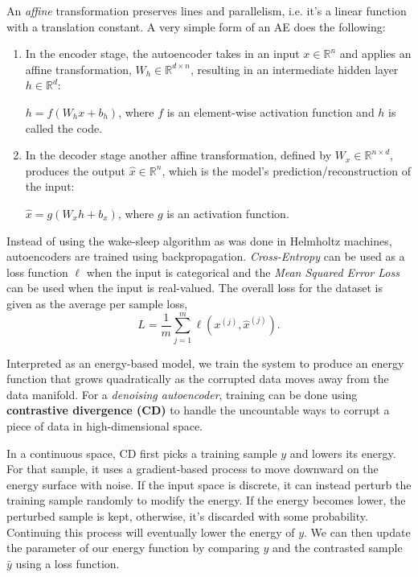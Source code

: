 \documentclass{article}
\begin{document}
An \textit{affine} transformation preserves lines and parallelism, i.e. it's a linear function with a translation constant. A very simple form of an AE does the following:

\begin{enumerate}
    \item In the encoder stage, the autoencoder takes in an input $x \in \mathbb R^n$ and applies an affine transformation, $W_h \in \mathbb R^{d\times n}$, resulting in an intermediate hidden layer $h \in \mathbb R^d$:
    
    $h = f(W_h x + b_h)$, where $f$ is an element-wise activation function and $h$ is called the code.
    
    \item In the decoder stage another affine transformation, defined by $W_x  \in \mathbb R^{n\times d}$, produces the output $\hat{x} \in \mathbb R^n$, which is the model's prediction/reconstruction of the input:
    
    $\hat{x} = g(W_x h + b_x)$, where $g$ is an activation function.
\end{enumerate}

Instead of using the wake-sleep algorithm as was done in Helmholtz machines, autoencoders are trained using backpropagation. \textit{Cross-Entropy} can be used as a loss function $\ell$ when the input is categorical and the \textit{Mean Squared Error Loss} can be used when the input is real-valued. The overall loss for the dataset is given as the average per sample loss,
\[
    L = \frac{1}{m}\sum_{j=1}^m \ell (x^{(j)}, \hat x^{(j)}).
\]


Interpreted as an energy-based model, we train the system to produce an energy function that grows quadratically as the corrupted data moves away from the data manifold. For a \textit{denoising autoencoder}, training can be done using \textbf{contrastive divergence (CD)} to handle the uncountable ways to corrupt a piece of data in high-dimensional space. 

In a continuous space, CD first picks a training sample $y$ and lowers its energy. For that sample, it uses a gradient-based process to move downward on the energy surface with noise. If the input space is discrete, it can instead perturb the training sample randomly to modify the energy. If the energy becomes lower, the perturbed sample is kept, otherwise, it's discarded with some probability. Continuing this process will eventually lower the energy of $y$. We can then update the parameter of our energy function by comparing $y$ and the contrasted sample $\bar y$ using a loss function.
\end{document}
